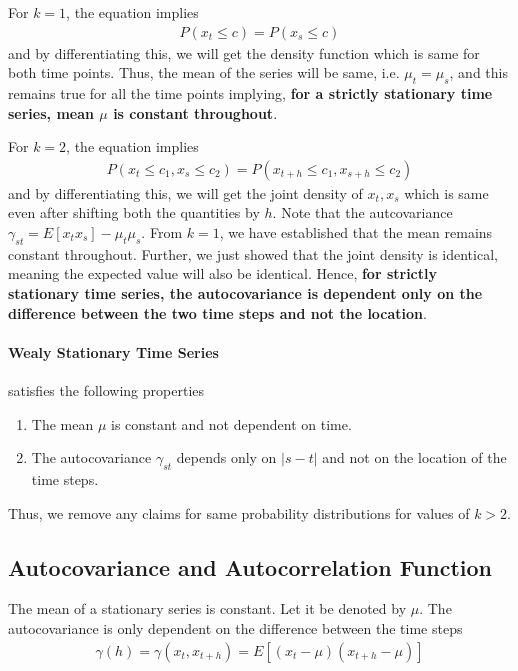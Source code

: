 \documentclass[../time_series_notes.tex]{subfiles}
\begin{document}
    For $k = 1$, the equation implies
    \begin{align*}
        P(x_{t} \leq c) = P(x_{s} \leq c)
    \end{align*}
    and by differentiating this, we will get the density function which is same for both time points. Thus, the mean of the series will be same, i.e. $\mu_{t} = \mu_{s}$, and this remains true for all the time points implying, \textbf{for a strictly stationary time series, mean $\mu$ is constant throughout}.\newline

    For $k=2$, the equation implies
    \begin{align*}
        P(x_{t} \leq c_{1}, x_{s} \leq c_{2}) = P(x_{t+h} \leq c_{1}, x_{s+h} \leq c_{2})
    \end{align*}
    and by differentiating this, we will get the joint density of $x_{t}, x_{s}$ which is same even after shifting both the quantities by $h$. Note that the autcovariance $\gamma_{st} = E[x_{t} x_{s}] - \mu_{t} \mu_{s}$. From $k=1$, we have established that the mean remains constant throughout. Further, we just showed that the joint density is identical, meaning the expected value will also be identical. Hence, \textbf{for strictly stationary time series, the autocovariance is dependent only on the difference between the two time steps and not the location}.\newline

    \paragraph{Wealy Stationary Time Series} satisfies the following properties
    \begin{enumerate}
        \item The mean $\mu$ is constant and not dependent on time.
        \item The autocovariance $\gamma_{st}$ depends only on $\lvert s - t \rvert$ and not on the location of the time steps.
    \end{enumerate}
    Thus, we remove any claims for same probability distributions for values of $k > 2$.\newline

    \subsection{Autocovariance and Autocorrelation Function}
    The mean of a stationary series is constant. Let it be denoted by $\mu$.\newline
    The autocovariance is only dependent on the difference between the time steps
    \begin{align*}
        \gamma (h) = \gamma(x_{t}, x_{t+h}) = E[(x_{t} - \mu)(x_{t+h} - \mu)]
    \end{align*}
\end{document}
